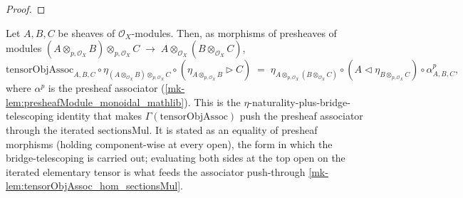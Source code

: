 \begin{proof}
  \leanok\end{proof}

\begin{lemma}\label{mk-lem:tensorObjAssoc_eta_factor}
  \leanok

  Let \(A, B, C\) be sheaves of \(\mathcal{O}_X\)-modules. Then, as morphisms of
  presheaves of modules
  \((A \otimes_{p,\mathcal{O}_X} B) \otimes_{p,\mathcal{O}_X} C
    \;\longrightarrow\; A \otimes_{\mathcal{O}_X} (B \otimes_{\mathcal{O}_X} C)\),
  \[
    \mathrm{tensorObjAssoc}_{A,B,C}
      \circ \eta_{(A \otimes_{\mathcal{O}_X} B) \otimes_{p,\mathcal{O}_X} C}
      \circ (\eta_{A \otimes_{p,\mathcal{O}_X} B} \rhd C)
    \;=\;
    \eta_{A \otimes_{p,\mathcal{O}_X} (B \otimes_{\mathcal{O}_X} C)}
      \circ (A \lhd \eta_{B \otimes_{p,\mathcal{O}_X} C})
      \circ \alpha^{p}_{A,B,C},
  \]
  where \(\alpha^{p}\) is the presheaf associator
  (\ref{mk-lem:presheafModule_monoidal_mathlib}). This is the
  \(\eta\)-naturality-plus-bridge-telescoping identity that makes
  \(\Gamma(\mathrm{tensorObjAssoc})\) push the presheaf associator through the
  iterated \(\mathrm{sectionsMul}\). It is stated as an equality of presheaf
  morphisms (holding component-wise at every open), the form in which the
  bridge-telescoping is carried out; evaluating both sides at the top open on the
  iterated elementary tensor is what feeds the associator push-through
  \ref{mk-lem:tensorObjAssoc_hom_sectionsMul}.
\end{lemma}

